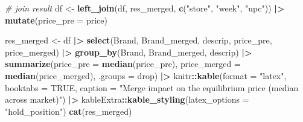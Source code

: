 \documentclass[
]{article}
\newenvironment{Shaded}{\begin{snugshade}}{\end{snugshade}}
\newcommand{\AttributeTok}[1]{\textcolor[rgb]{0.13,0.29,0.53}{#1}}
\newcommand{\CommentTok}[1]{\textcolor[rgb]{0.56,0.35,0.01}{\textit{#1}}}
\newcommand{\ConstantTok}[1]{\textcolor[rgb]{0.56,0.35,0.01}{#1}}
\newcommand{\FunctionTok}[1]{\textcolor[rgb]{0.13,0.29,0.53}{\textbf{#1}}}
\newcommand{\NormalTok}[1]{#1}
\newcommand{\OtherTok}[1]{\textcolor[rgb]{0.56,0.35,0.01}{#1}}
\newcommand{\SpecialCharTok}[1]{\textcolor[rgb]{0.81,0.36,0.00}{\textbf{#1}}}
\newcommand{\StringTok}[1]{\textcolor[rgb]{0.31,0.60,0.02}{#1}}
\begin{document}
\begin{Shaded}
\begin{Highlighting}[]
\CommentTok{\# join result}
\NormalTok{df }\OtherTok{\textless{}{-}} \FunctionTok{left\_join}\NormalTok{(df, res\_merged, }\FunctionTok{c}\NormalTok{(}\StringTok{"store"}\NormalTok{, }\StringTok{"week"}\NormalTok{, }\StringTok{"upc"}\NormalTok{)) }\SpecialCharTok{|\textgreater{}}
  \FunctionTok{mutate}\NormalTok{(}\AttributeTok{price\_pre =}\NormalTok{ price)}

\NormalTok{res\_merged }\OtherTok{\textless{}{-}}\NormalTok{ df }\SpecialCharTok{|\textgreater{}}
  \FunctionTok{select}\NormalTok{(Brand, Brand\_merged,  descrip, price\_pre, price\_merged) }\SpecialCharTok{|\textgreater{}}
  \FunctionTok{group\_by}\NormalTok{(Brand, Brand\_merged,  descrip) }\SpecialCharTok{|\textgreater{}}
  \FunctionTok{summarize}\NormalTok{(}\AttributeTok{price\_pre =} \FunctionTok{median}\NormalTok{(price\_pre),}
            \AttributeTok{price\_merged =} \FunctionTok{median}\NormalTok{(price\_merged),}
            \AttributeTok{.groups =} \StringTok{\textquotesingle{}drop\textquotesingle{}}\NormalTok{) }\SpecialCharTok{|\textgreater{}}
\NormalTok{  knitr}\SpecialCharTok{::}\FunctionTok{kable}\NormalTok{(}\AttributeTok{format =} \StringTok{"latex"}\NormalTok{, }\AttributeTok{booktabs =} \ConstantTok{TRUE}\NormalTok{, }
               \AttributeTok{caption =} \StringTok{"Merge impact on the equilibrium price (median across market)"}\NormalTok{) }\SpecialCharTok{|\textgreater{}}
\NormalTok{  kableExtra}\SpecialCharTok{::}\FunctionTok{kable\_styling}\NormalTok{(}\AttributeTok{latex\_options =} \StringTok{"hold\_position"}\NormalTok{)}
\FunctionTok{cat}\NormalTok{(res\_merged)}
\end{Highlighting}
\end{Shaded}
\end{document}
